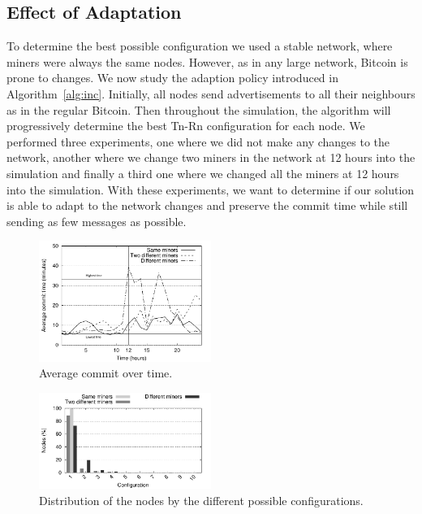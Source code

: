 \documentclass{dads}   %
\begin{document}
\subsection{Effect of Adaptation}
To determine the best possible configuration we used a stable network, where miners were always the same nodes. However, as in any large network, Bitcoin is prone to changes.
We now study the adaption policy introduced in Algorithm~\ref{alg:inc}.
Initially, all nodes send advertisements to all their neighbours as in the regular Bitcoin. Then throughout the simulation, the algorithm will progressively determine the best Tn-Rn configuration for each node. We performed three experiments, one where we did not make any changes to the network, another where we change two miners in the network at 12 hours into the simulation and finally a third one where we changed all the miners at 12 hours into the simulation. With these experiments, we want to determine if our solution is able to adapt to the network changes and preserve the commit time while still sending as few messages as possible.

\begin{figure}[t]
\centering
\includegraphics[width=0.5\textwidth]{plots/commit_over_time.pdf}
\caption{Average commit over time.}
\label{fig:commit-over-time}
\end{figure}

\begin{figure}[t]
\centering
\includegraphics[width=0.5\textwidth]{plots/nodes_per_config.pdf}
\caption{Distribution of the nodes by the different possible configurations.}
\label{fig:node-per-conf}
\end{figure}
\end{document}
